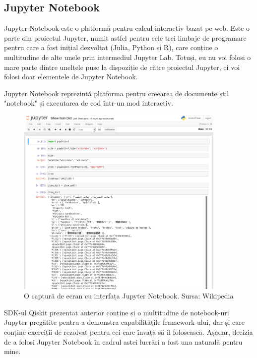 \subsection{Jupyter Notebook}

Jupyter Notebook este o platformă pentru calcul interactiv bazat pe web. Este o parte din proiectul Jupyter, numit astfel pentru cele trei limbaje de programare pentru care a fost inițial dezvoltat (Julia, Python și R), care conține o multitudine de alte unele prin intermediul Jupyter Lab. Totuși, eu nu voi folosi o mare parte dintre uneltele puse la dispoziție de către proiectul Jupyter, ci voi folosi doar elementele de Jupyter Notebook.

Jupyter Notebook reprezintă platforma pentru creearea de documente stil "notebook" și executarea de cod într-un mod interactiv. 

\begin{figure}[H]
    \centering
    \includegraphics[width=0.9\textwidth]{continut/capitol2/figuri/JupyterNotebookInterface.png}
    \caption{O captură de ecran cu interfața Jupyter Notebook. Sursa: Wikipedia}
    \label{fig:JupyterNotebookInterface}
\end{figure}

SDK-ul Qiskit prezentat anterior conține și o multitudine de notebook-uri Jupyter pregătite pentru a demonstra capabilitățile framework-ului, dar și care conține exerciții de rezolvat pentru cei care învață să îl folosească. Așadar, decizia de a folosi Jupyter Notebook în cadrul astei lucrări a fost una naturală pentru mine.